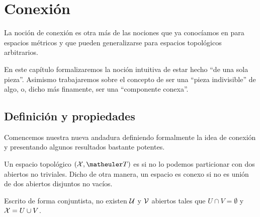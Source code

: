 \chapter{Conexión}
\label{conex}
La noción de conexión es otra más de las nociones que ya conocíamos en para espacios métricos y que pueden generalizarse para espacios topológicos arbitrarios.

En este capítulo formalizaremos la noción intuitiva de estar hecho ``de una sola pieza''. Asimismo trabajaremos sobre el concepto de ser una ``pieza indivisible'' de algo, o, dicho más finamente, ser una ``componente conexa''. 
\section{Definición y propiedades}
Comencemos nuestra nueva andadura definiendo formalmente la idea de conexión y presentando algunos resultados bastante potentes.

\begin{defi}[Conexión]
	Un espacio topológico $(\X,\T)$ es   si no lo podemos particionar con dos abiertos no triviales. Dicho de otra manera, un espacio es conexo si no es unión de dos abiertos disjuntos no vacíos.
	
	Escrito de forma conjuntista, no existen $\mathcal{U}$ y $\mathcal{V}$ abiertos tales que $U\cap V=\emptyset$ y $\mathcal{X}=U\cup V$.
\end{defi}

